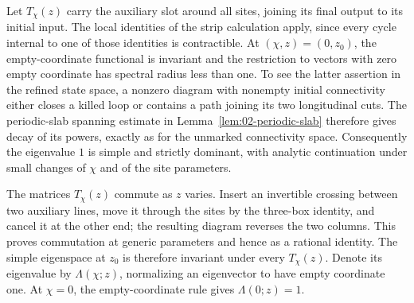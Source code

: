 Let \(T_\chi(z)\) carry the auxiliary slot around all sites, joining its final output to its initial input. The local identities of the strip calculation apply, since every cycle internal to one of those identities is contractible. At \((\chi,z)=(0,z_0)\), the empty-coordinate functional is invariant and the restriction to vectors with zero empty coordinate has spectral radius less than one. To see the latter assertion in the refined state space, a nonzero diagram with nonempty initial connectivity either closes a killed loop or contains a path joining its two longitudinal cuts. The periodic-slab spanning estimate in Lemma~\ref{lem:02-periodic-slab} therefore gives decay of its powers, exactly as for the unmarked connectivity space. Consequently the eigenvalue \(1\) is simple and strictly dominant, with analytic continuation under small changes of \(\chi\) and of the site parameters.

The matrices \(T_\chi(z)\) commute as \(z\) varies. Insert an invertible crossing between two auxiliary lines, move it through the sites by the three-box identity, and cancel it at the other end; the resulting diagram reverses the two columns. This proves commutation at generic parameters and hence as a rational identity. The simple eigenspace at \(z_0\) is therefore invariant under every \(T_\chi(z)\). Denote its eigenvalue by \(\Lambda(\chi;z)\), normalizing an eigenvector to have empty coordinate one. At \(\chi=0\), the empty-coordinate rule gives \(\Lambda(0;z)=1\).

